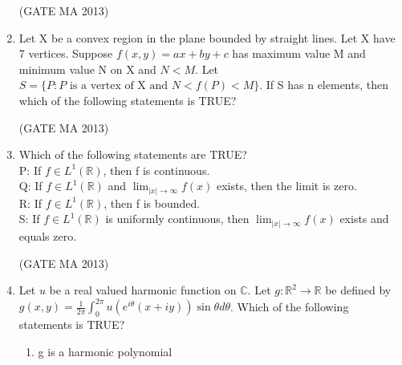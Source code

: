 \documentclass[journal,12pt,onecolumn]{IEEEtran}
\theoremstyle{remark}
\begin{document}
\begin{enumerate}
\begin{enumerate}
\begin{multicols}{2}
    \end{multicols}
    \end{enumerate}
    \hfill (GATE MA 2013)
    \item Let X be a convex region in the plane bounded by straight lines. Let X have 7 vertices. Suppose $f(x,y) = ax+by+c$ has maximum value M and minimum value N on X and $N < M$. Let $S = \{P : P \text{ is a vertex of X and } N < f(P) < M\}$. If S has n elements, then which of the following statements is TRUE?
    \begin{enumerate}
    \end{enumerate}
    \hfill (GATE MA 2013)
    \item Which of the following statements are TRUE? \\
    P: If $f \in L^1(\mathbb{R})$, then f is continuous. \\
    Q: If $f \in L^1(\mathbb{R})$ and $\lim_{|x| \to \infty} f(x)$ exists, then the limit is zero. \\
    R: If $f \in L^1(\mathbb{R})$, then f is bounded. \\
    S: If $f \in L^1(\mathbb{R})$ is uniformly continuous, then $\lim_{|x| \to \infty} f(x)$ exists and equals zero.
    \begin{enumerate}
    \end{enumerate}
    \hfill (GATE MA 2013)
    \item Let $u$ be a real valued harmonic function on $\mathbb{C}$. Let $g: \mathbb{R}^2 \rightarrow \mathbb{R}$ be defined by $g(x,y) = \frac{1}{2\pi} \int_0^{2\pi} u(e^{i\theta}(x+iy)) \sin\theta d\theta$. Which of the following statements is TRUE?
    \begin{enumerate}
        \item g is a harmonic polynomial

\end{enumerate}
\end{enumerate}
\end{document}
